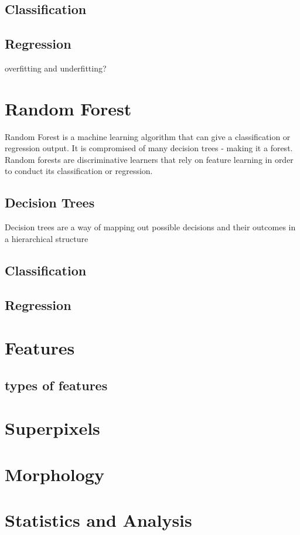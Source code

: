 \subsection{Classification}
\subsection{Regression}
	overfitting and underfitting?
\section{Random Forest}
Random Forest is a machine learning algorithm that can give a classification or regression output. It is compromised of many decision trees - making it a forest.  Random forests are discriminative learners that rely on feature learning in order to conduct its classification or regression. 

\subsection{Decision Trees}
Decision trees are a way of mapping out possible decisions and their outcomes in a hierarchical structure 
		\subsection{Classification}
		\subsection{Regression}
\section{Features}
	\subsection{types of features}
\section{Superpixels}
\section{Morphology}
\section{Statistics and Analysis}
